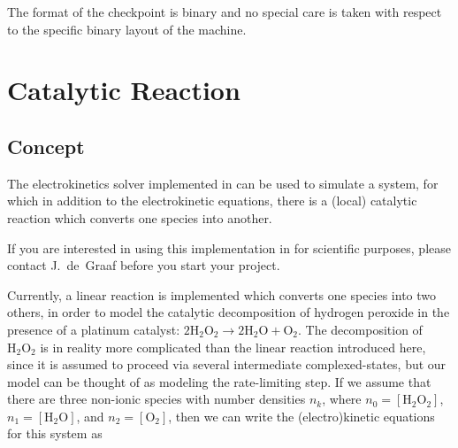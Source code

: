 The format of the checkpoint is binary and no special care is taken with 
respect to the specific binary layout of the machine.

\section{Catalytic Reaction}

\subsection{Concept}

The electrokinetics solver implemented in \es{} can be used to
simulate a system, for which in addition to the electrokinetic
equations, there is a (local) catalytic reaction which converts one
species into another.

If you are interested in using this implementation in \es{} for
scientific purposes, please contact J.~de~Graaf before you start your
project.

Currently, a linear reaction is implemented which converts one species into two others, in
order to model the catalytic decomposition of hydrogen peroxide in the presence
of a platinum catalyst: $2 \mathrm{H}_{2}\mathrm{O}_{2} \rightarrow 
2 \mathrm{H}_{2}\mathrm{O} + \mathrm{O}_{2}$. The decomposition of 
$\mathrm{H}_{2}\mathrm{O}_{2}$ is in reality more complicated than the linear 
reaction introduced here, since it is assumed to proceed via several intermediate complexed-states, 
but our model can be thought of as modeling the rate-limiting step.
If we assume that there are three non-ionic species with number densities
$n_{k}$, where $n_{0} = [ \mathrm{H}_{2}\mathrm{O}_{2} ]$,
$n_{1} = [ \mathrm{H}_{2}\mathrm{O} ]$, and $n_{2} = [ \mathrm{O}_{2} ]$, 
then we can write the (electro)kinetic equations for this system as

